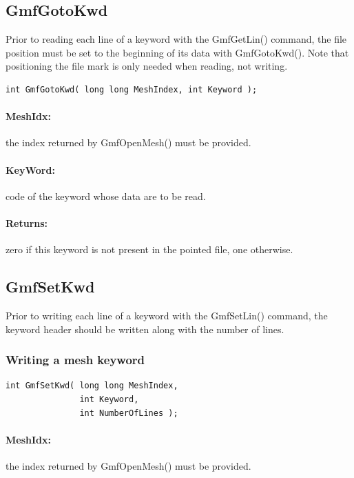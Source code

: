 \documentclass[a4paper,12pt]{article}
\begin{document}
\subsection{GmfGotoKwd}
Prior to reading each line of a keyword with the GmfGetLin() command, the file position must be set to the beginning of its data with GmfGotoKwd(). Note that positioning the file mark is only needed when reading, not writing.

\begin{tt}
\begin{verbatim}
int GmfGotoKwd( long long MeshIndex, int Keyword );
\end{verbatim}
\end{tt}
\normalfont

\paragraph{MeshIdx:}
the index returned by GmfOpenMesh() must be provided.

\paragraph{KeyWord:} code of the keyword whose data are to be read.

\paragraph{Returns:} zero if this keyword is not present in the pointed file, one otherwise.


\subsection{GmfSetKwd}
Prior to writing each line of a keyword with the GmfSetLin() command, the keyword header should be written along with the number of lines.

\subsubsection{Writing a mesh keyword}

\begin{tt}
\begin{verbatim}
int GmfSetKwd( long long MeshIndex,
               int Keyword,
               int NumberOfLines );
\end{verbatim}
\end{tt}
\normalfont

\paragraph{MeshIdx:}
the index returned by GmfOpenMesh() must be provided.
\end{document}
